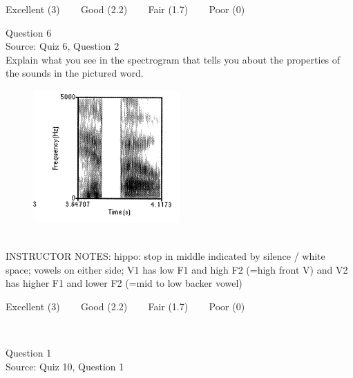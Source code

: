 \documentclass[12pt]{article}
\begin{document}
\vfill
Excellent (3) ~~~ Good (2.2) ~~~ Fair (1.7) ~~~ Poor (0)
\newpage

{\large Question 6}\\

Source: Quiz 6, Question 2\\

Explain what you see in the spectrogram that tells you about the properties of the sounds in the pictured word.\\

\begin{figure}[H]
\includegraphics{../images/spectrogram_hippo.png}
\end{figure}

~\\
INSTRUCTOR NOTES: hippo: stop in middle indicated by silence / white space; vowels on either side; V1 has low F1 and high F2 (=high front V) and V2 has higher F1 and lower F2 (=mid to low backer vowel)


\vfill
Excellent (3) ~~~ Good (2.2) ~~~ Fair (1.7) ~~~ Poor (0)
\newpage

\begin{center}
\textbf{{\color{red}{\HUGE END OF EXAM}}}\\

\end{center}
\newpage

\begin{center}
\textbf{{\color{blue}{\HUGE START OF EXAM\\}}}

\textbf{{\color{blue}{\HUGE Student ID: 3420\\}}}

\textbf{{\color{blue}{\HUGE 5:20 - 5:40 PM\\}}}

\end{center}
\newpage

{\large Question 1}\\

Source: Quiz 10, Question 1\\
\end{document}

